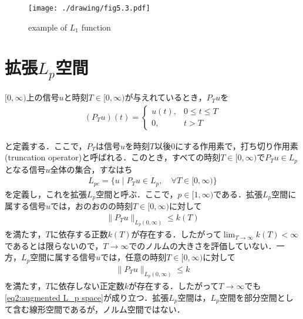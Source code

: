 \documentclass[a4paper,11pt,uplatex]{jsarticle} %
\theoremstyle{definition}	%
\begin{document}
\begin{figure}[t]
\centering
\texttt{[image: ./drawing/fig5.3.pdf]}
\caption{example of $L_1$ function}
\label{fig5.3}
\end{figure}
\section{拡張$L_p$空間}
$[0, \infty)$上の信号$u$と時刻$T \in [0, \infty) $が与えれているとき，$P_T u $を
\begin{align}
\label{truncation operator}
(P_T u)(t) =
\begin{cases}
u(t), & 0 \leq t \leq T \\
0,    & t>T
\end{cases}
\end{align}

と定義する．ここで，$P_T$は信号$u$を時刻$T$以後$0$にする作用素で，打ち切り作用素(truncation operator)と呼ばれる．このとき，すべての時刻$T \in [0,\infty)$で$P_T u \in L_p $となる信号$u$全体の集合，すなはち
\begin{align}
\label{augmented L_p space}
L_{pe} = \{u \mid P_T u \in L_p, \quad \forall T \in [0, \infty )\}
\end{align}
を定義し，これを拡張$L_p$空間と呼ぶ．ここで，$p \in [1, \infty ) $である．拡張$L_p$空間に属する信号$u$では，おのおのの時刻$T \in [0, \infty )$に対して
\begin{align}
\label{eq1:augmented L_p space}
\| P_T u \|_{L_p (0, \infty)} \leq k(T)
\end{align}
を満たす，$T$に依存する正数$k(T)$が存在する．したがって$\lim_{T \to \infty } k(T) < \infty $であるとは限らないので，$T \to \infty $でのノルムの大きさを評価していない．一方，$L_p$空間に属する信号$u$では，任意の時刻$T \in [0, \infty)$に対して
\begin{align}
\label{eq2:augmented L_p space}
\| P_T u \|_{L_p (0, \infty )} \leq k
\end{align}
を満たす，$T$に依存しない正定数$k$が存在する．したがって$T \to \infty $でも\eqref{eq2:augmented L_p space}が成り立つ．拡張$L_p$空間は，$L_p$空間を部分空間として含む線形空間であるが，ノルム空間ではない．
\end{document}
